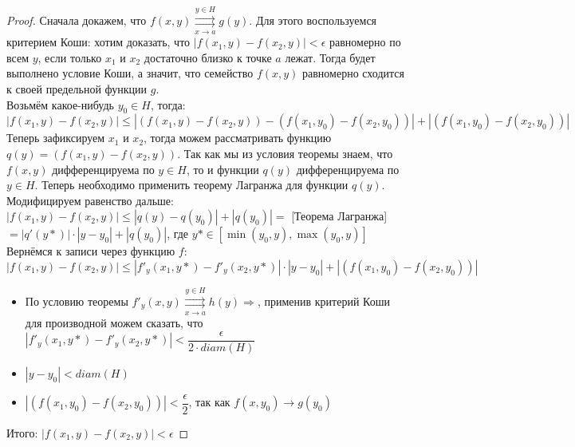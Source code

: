 \begin{proof}
   Сначала докажем, что $f(x, y) \overset{y \in H}{\underset{x \to a}{\rightrightarrows}} g(y)$. Для
   этого воспользуемся критерием Коши: хотим доказать, что $|f(x_1, y) - f(x_2, y)| < \epsilon$
   равномерно по всем $y$, если только $x_1$ и $x_2$ достаточно близко к точке $a$ лежат. Тогда будет
   выполнено условие Коши, а значит, что семейство $f(x, y)$ равномерно сходится к своей предельной
   функции $g$. \\
   Возьмём какое-нибудь $y_0 \in H$, тогда: \\
   $|f(x_1, y) - f(x_2, y)| \leqslant |(f(x_1, y) - f(x_2, y)) - (f(x_1, y_0) - f(x_2, y_0))| +
   |(f(x_1, y_0) - f(x_2, y_0))|$ \\
   Теперь зафиксируем $x_1$ и $x_2$, тогда можем рассматривать функцию $q(y) = (f(x_1, y) - f(x_2, y))$.
   Так как мы из условия теоремы знаем, что $f(x,y)$ дифференцируема по $y \in H$, то и 
   функции $q(y)$ дифференцируема по $y \in H$. Теперь необходимо применить теорему Лагранжа
   для функции $q(y)$. Модифицируем равенство дальше: \\
   $|f(x_1, y) - f(x_2, y)| \leqslant |q(y) - q(y_0)| +
   |q(y_0)| =$ [Теорема Лагранжа] $= |q'(y*)| \cdot |y - y_0| + |q(y_0)|$, где
   $y* \in [\min(y_0, y), \max(y_0, y)]$ \\
   Вернёмся к записи через функцию $f$: \\
   $|f(x_1, y) - f(x_2, y)|  \leqslant |f'_y(x_1, y*) - f'_y(x_2, y*)|\cdot |y - y_0| +|(f(x_1, y_0) - f(x_2, y_0))| $ \\
   \begin{itemize}
       \item По условию теоремы $f'_y(x, y) \overset{y \in H}{\underset{x \to a}{\rightrightarrows}} h(y) \Rightarrow$,
   применив критерий Коши для производной можем сказать, что $|f'_y(x_1, y*) - f'_y(x_2, y*)|
   < \dfrac{\epsilon}{2 \cdot diam(H)}$
        \item $|y - y_0| < diam(H)$
        \item $|(f(x_1, y_0) - f(x_2, y_0))| < \dfrac{\epsilon}{2}$, так как
        $f(x, y_0) \to g(y_0)$  
    \end{itemize}
    Итого: $|f(x_1, y) - f(x_2, y)| < \epsilon$


\end{proof}
